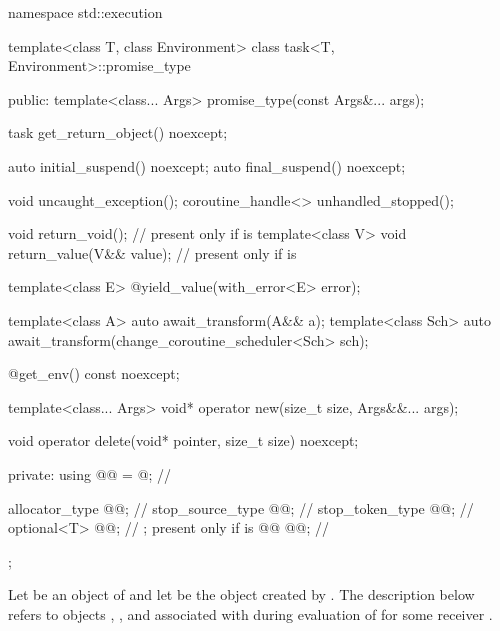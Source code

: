 \begin{codeblock}
namespace std::execution {
  template<class T, class Environment>
  class task<T, Environment>::promise_type {
  public:
    template<class... Args>
      promise_type(const Args&... args);

    task get_return_object() noexcept;

    auto initial_suspend() noexcept;
    auto final_suspend() noexcept;

    void uncaught_exception();
    coroutine_handle<> unhandled_stopped();

    void return_void();                 // present only if  is 
    template<class V>
      void return_value(V&& value);     // present only if  is 

    template<class E>
      @\unspec@ yield_value(with_error<E> error);

    template<class A>
      auto await_transform(A&& a);
    template<class Sch>
      auto await_transform(change_coroutine_scheduler<Sch> sch);

    @\unspec@ get_env() const noexcept;

    template<class... Args>
      void* operator new(size_t size, Args&&... args);

    void operator delete(void* pointer, size_t size) noexcept;

  private:
    using @@ = @\seebelownc@;    // \expos

    allocator_type    @@;            // \expos
    stop_source_type  @@;           // \expos
    stop_token_type   @@;            // \expos
    optional<T>       @@;           // \expos; present only if  is 
    @@     @@;           // \expos
  };
}
\end{codeblock}

\pnum
Let  be an object of 
and let  be the  object
created by .
The description below
refers to objects ,
,
and 
associated with 
during evaluation of 
for some receiver .

